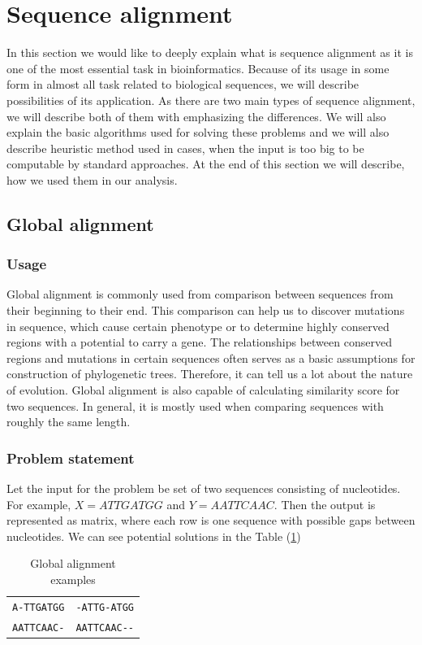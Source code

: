 \section{Sequence alignment}
In this section we would like to deeply explain what is sequence alignment as it is one of the most essential task in bioinformatics.
Because of its usage in some form in almost all task related to biological sequences, we will describe possibilities of its application.
As there are two main types of sequence alignment, we will describe both of them with emphasizing the differences.
We will also explain the basic algorithms used for solving these problems and we will also describe heuristic method used in cases, when the input is too big to be computable by standard approaches.
At the end of this section we will describe, how we used them in our analysis.

\subsection{Global alignment}
\subsubsection{Usage}
Global alignment is commonly used from comparison between sequences from their beginning to their end.
This comparison can help us to discover mutations in sequence, which cause certain phenotype or to determine highly conserved regions with a potential to carry a gene.
The relationships between conserved regions and mutations in certain sequences often serves as a basic assumptions for construction of phylogenetic trees.
Therefore, it can tell us a lot about the nature of evolution.
Global alignment is also capable of calculating similarity score for two sequences.
In general, it is mostly used when comparing sequences with roughly the same length.

\subsubsection{Problem statement}
Let the input for the problem be set of two sequences consisting of nucleotides.
For example, $ X = ATTGATGG $ and $ Y = AATTCAAC $.
Then the output is represented as matrix, where each row is one sequence with possible gaps between nucleotides.
We can see potential solutions in the Table (\ref{tab:potsol})

\begin{table}
  \centering
    \begin{tabular}{ l | r }
    \verb|A-TTGATGG| & \verb|-ATTG-ATGG| \\
    \verb|AATTCAAC-| & \verb|AATTCAAC--| \\
    \end{tabular}
  \caption{Global alignment examples}
  \label{tab:potsol}
\end{table} 

